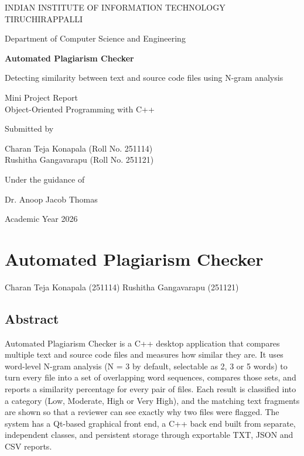 \documentclass[12pt,a4paper,oneside]{book}
\makeatletter
\newcommand{\chapterauthor}[1]{%
  {\parindent0pt\vspace*{-15pt}%
  \linespread{1.1}\large\itshape\begin{flushright}#1\end{flushright}%
  \par\nobreak\vspace*{25pt}}
  \@afterheading%
}
\makeatother
\begin{document}
\begin{titlepage}
\centering
{\large INDIAN INSTITUTE OF INFORMATION TECHNOLOGY TIRUCHIRAPPALLI\par}
{\normalsize Department of Computer Science and Engineering\par}
\vspace{2cm}
{\LARGE\bfseries Automated Plagiarism Checker\par}
\vspace{0.5cm}
{\large Detecting similarity between text and source code files using N-gram analysis\par}
\vspace{1.2cm}
{\normalsize Mini Project Report\\Object-Oriented Programming with C++\par}
\vspace{1.8cm}
{\normalsize Submitted by\par}
\vspace{0.3cm}
{\normalsize Charan Teja Konapala (Roll No. 251114)\\Rushitha Gangavarapu (Roll No. 251121)\par}
\vspace{1cm}
{\normalsize Under the guidance of\par}
{\normalsize Dr. Anoop Jacob Thomas\par}
\vspace{1.5cm}
{\normalsize Academic Year 2026\par}
\end{titlepage}

\tableofcontents
\listoffigures
\listoftables

\mainmatter

\chapter{Automated Plagiarism Checker}
\chapterauthor{Charan Teja Konapala (251114) \quad Rushitha Gangavarapu (251121)}

\section*{Abstract}
Automated Plagiarism Checker is a C++ desktop application that compares multiple text and source code files and measures how similar they are. It uses word-level N-gram analysis (N = 3 by default, selectable as 2, 3 or 5 words) to turn every file into a set of overlapping word sequences, compares those sets, and reports a similarity percentage for every pair of files. Each result is classified into a category (Low, Moderate, High or Very High), and the matching text fragments are shown so that a reviewer can see exactly why two files were flagged. The system has a Qt-based graphical front end, a C++ back end built from separate, independent classes, and persistent storage through exportable TXT, JSON and CSV reports.
\end{document}
